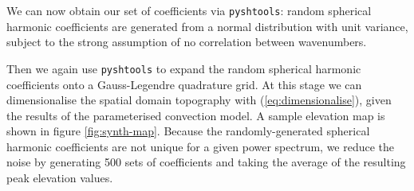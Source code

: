 We can now obtain our set of coefficients via {\tt pyshtools}: %
random spherical harmonic coefficients are generated from a normal distribution with unit variance, subject to the strong assumption of no correlation between wavenumbers. 



Then we again use {\tt pyshtools} to expand the random spherical harmonic coefficients onto a Gauss-Legendre quadrature grid.
At this stage we can dimensionalise the spatial domain topography with (\ref{eq:dimensionalise}), given the results of the parameterised convection model. A sample elevation map is shown in figure \ref{fig:synth-map}. %
Because the randomly-generated spherical harmonic coefficients are not unique for a given power spectrum, we reduce the noise by generating 500 sets of coefficients and taking the average of the resulting peak elevation values.


